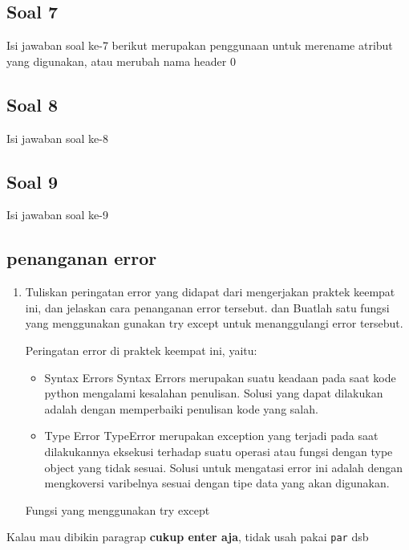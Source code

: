 \subsection{Soal 7}
Isi jawaban soal ke-7
 berikut merupakan penggunaan untuk merename atribut yang digunakan, atau merubah nama header 0
    
\subsection{Soal 8}
Isi jawaban soal ke-8
  
\subsection{Soal 9}
Isi jawaban soal ke-9
 
\subsection{penanganan error}
\begin{enumerate}
	\item Tuliskan  peringatan  error  yang  didapat  dari  mengerjakan  praktek  keempat  ini, dan  jelaskan  cara  penanganan  error  tersebut.   dan  Buatlah  satu  fungsi  yang menggunakan gunakan try except untuk menanggulangi error tersebut.
	
	Peringatan error di praktek keempat ini, yaitu:
	\begin{itemize}
		\item Syntax Errors
		Syntax Errors merupakan suatu keadaan pada saat kode python mengalami kesalahan penulisan. Solusi yang dapat dilakukan adalah dengan memperbaiki penulisan kode yang salah.
		
		\item Type Error
		TypeError merupakan exception yang terjadi pada saat dilakukannya eksekusi terhadap suatu operasi atau fungsi dengan type object yang tidak sesuai. Solusi untuk mengatasi error ini adalah dengan mengkoversi varibelnya sesuai dengan tipe data yang akan digunakan.
	\end{itemize}
Fungsi yang menggunakan try except
	
\end{enumerate}



Kalau mau dibikin paragrap \textbf{cukup enter aja}, tidak usah pakai \verb|par| dsb

